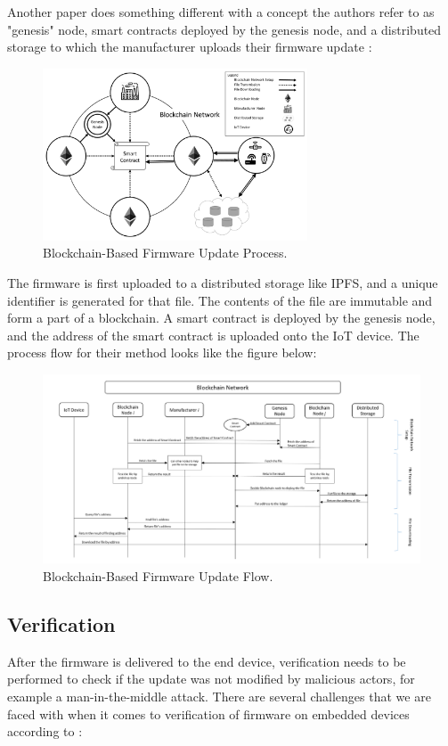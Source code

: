 \documentclass{article}
\begin{document}
Another paper does something different with a concept the authors refer to as "genesis" node, smart contracts deployed by the genesis node, and a distributed storage to which the manufacturer uploads their firmware update \cite{blockchainupdate}:
\begin{figure}[H]
    \centering
    \includegraphics[width=0.7\textwidth]{blockchainupdate01.png}
    \caption{Blockchain-Based Firmware Update Process.\cite{blockchainupdate}}
\end{figure}


The firmware is first uploaded to a distributed storage like IPFS, and a unique identifier is generated for that file. The contents of the file are immutable and form a part of a blockchain. A smart contract is deployed by the genesis node, and the address of the smart contract is uploaded onto the IoT device. The process flow for their method looks like the figure below:
\begin{figure}[H]
    \centering
    \includegraphics[width=\textwidth]{blockchainupdate02.png}
    \caption{Blockchain-Based Firmware Update Flow.\cite{blockchainupdate}}
\end{figure}

\subsection{Verification}
After the firmware is delivered to the end device, verification needs to be performed to check if the update was not modified by malicious actors, for example a man-in-the-middle attack. There are several challenges that we are faced with when it comes to verification of firmware on embedded devices according to \cite{verification}:
\end{document}
